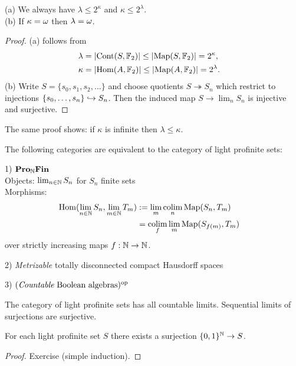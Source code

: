 \documentclass{notes}
\begin{document}
\begin{prop}
(a) We always have $\lambda\leq 2^\kappa$ and $\kappa\leq 2^\lambda$. \\
(b) If $\kappa={\omega}$ then $\lambda={\omega}$. 
\end{prop}

\begin{proof}
(a) follows from
\begin{align*}
  \lambda &= |{\rm Cont}(S,{\mathbb{F}}_2)| \leq |{\rm Map}(S,{\mathbb{F}}_2)| = 2^\kappa, \cr
  \kappa &= |\mathrm{Hom}(A,{\mathbb{F}}_2)| \leq |{\rm Map}(A,{\mathbb{F}}_2)| = 2^\lambda.
\end{align*}
(b) Write $S=\{s_0,s_1,s_2,\dots\}$ and choose quotients
$S\twoheadrightarrow S_n$ which restrict to injections
$\{s_0,\dots,s_n\}\hookrightarrow S_n$. Then the induced map $S\to\lim_n S_n$ is
injective and surjective.
\end{proof}

\begin{rem}
The same proof shows: if $\kappa$ is infinite then $\lambda\leq\kappa$.
\end{rem}

\begin{prop}
The following categories are equivalent to the category of light
profinite sets:

1) $\text{\bf Pro}_{{\mathbb{N}}}\text{\bf Fin}$ \\
Objects: $\lim_{n\in{\mathbb{N}}}S_n$ for $S_n$ finite sets
\\
Morphisms: 
\begin{align*}
  \mathrm{Hom}(\lim_{n\in{\mathbb{N}}}S_n,\lim_{m\in{\mathbb{N}}}T_m)
  &:= \lim_m\operatorname*{colim}_n{\rm Map}(S_n,T_m) \cr
  &= \operatorname*{colim}_f\lim_m{\rm Map}(S_{f(m)},T_m)
\end{align*}
over strictly increasing maps $f:{\mathbb{N}}\to{\mathbb{N}}$.
  
2) {\em Metrizable} totally disconnected compact Hausdorff spaces

3) $(\text{{\em Countable} Boolean algebras})^{\rm op}$
\end{prop}

\begin{prop}
The category of light profinite sets has all countable
limits. Sequential limits of surjections are surjective. 
\end{prop}

\begin{prop}
For each light profinite set $S$ there exists a surjection
$\{0,1\}^{\mathbb{N}}\to S$. 
\end{prop}

\begin{proof}
Exercise (simple induction).
\end{proof}
\end{document}
